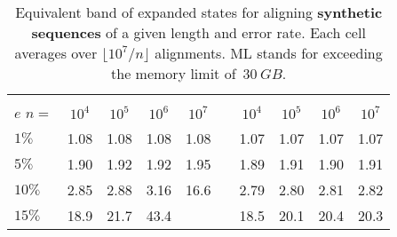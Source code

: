 \begin{table}[t]
  \centering
  \sffamily
  \setlength{\tabcolsep}{3pt}
  \begin{tabular}{lSSSSlSSSS}
    &  &  &  \\
     
    $e$ \quad $n=$\hspace{-0.5em} & {$10^4$} & {$10^5$} & {$10^6$} & {$10^7$}  && {$10^4$} & {$10^5$} & {$10^6$} & {$10^7$} \\
    $1\%$ & 1.08 & 1.08 & 1.08 & 1.08 &
    & 1.07 & 1.07 & 1.07 & 1.07 \\
    $5\%$ & 1.90 & 1.92 & 1.92 & 1.95 &
    & 1.89 & 1.91 & 1.90 & 1.91 \\
    $10\%$ & 2.85 & 2.88 & 3.16 & 16.6 &
    & 2.79 & 2.80 & 2.81 & 2.82 \\
    $15\%$ & 18.9 & 21.7 & 43.4 &  &
    & 18.5 & 20.1 & 20.4 & 20.3 \\
  \end{tabular}
  \caption[Equivalent band of expanded states for the (chaining) seed heuristic
           (various sequence lengths and error rates)]{Equivalent band of
           expanded states for aligning \textbf{synthetic sequences} of a given
           length and error rate. Each cell averages over $\lfloor
           10^7/n\rfloor$ alignments. ML stands for exceeding the memory limit
           of~$\qty{30}{GB}$.}
  \label{GLOBALtab:band}
\end{table}
